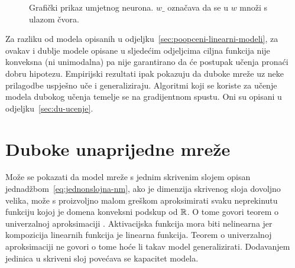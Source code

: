 \documentclass[utf8, diplomski, lmodern]{fer}
\begin{document}
\begin{figure}
	\centering
	\caption{Grafički prikaz umjetnog neurona. $w\_$ označava da se u $w$ množi s ulazom čvora.}
	\label{fig:umjetni-neuron}
\end{figure}

Za razliku od modela opisanih u odjeljku~\ref{sec:poopceni-linearni-modeli}, za ovakav i dublje modele opisane u sljedećim odjeljcima ciljna funkcija nije konveksna (ni unimodalna) pa nije garantirano da će postupak učenja pronaći dobru hipotezu. Empirijski rezultati ipak pokazuju da duboke mreže uz neke prilagodbe uspješno uče i generaliziraju. Algoritmi koji se koriste za učenje modela dubokog učenja temelje se na gradijentnom spustu. Oni su opisani u odjeljku~\ref{sec:du-ucenje}.


\section{Duboke unaprijedne mreže}

Može se pokazati da model mreže s jednim skrivenim slojem opisan jednadžbom~\eqref{eq:jednonslojna-nm}, ako je dimenzija skrivenog sloja dovoljno velika, može s proizvoljno malom greškom aproksimirati svaku neprekinutu funkciju kojoj je domena konveksni podskup od $\mathbb{R}$. O tome govori teorem o univerzalnoj aproksimaciji \citep{Cybenko:ASSF:1989,Leshno:1993:MFFNWNPA}. Aktivacijska funkcija mora biti nelinearna jer kompozicija linearnih funkcija je linearna funkcija. Teorem o univerzalnoj aproksimaciji ne govori o tome hoće li takav model generalizirati. Dodavanjem jedinica u skriveni sloj povećava se kapacitet modela.
\end{document}

